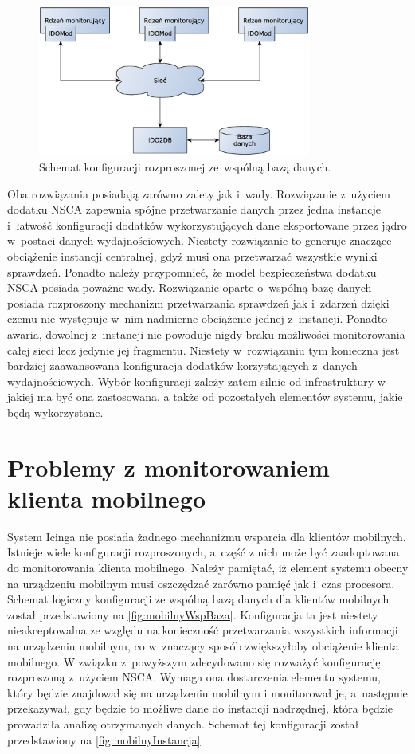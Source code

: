\begin{figure}[ht]
\centering
  \caption{Schemat konfiguracji rozproszonej ze~wspólną bazą danych.}
  \label{fig:rozpFull}
\includegraphics[width=0.8\textwidth]{img/icingaFull}
\end{figure}

Oba rozwiązania posiadają zarówno zalety jak i~wady. Rozwiązanie
z~użyciem dodatku NSCA zapewnia spójne przetwarzanie danych przez
jedna instancje i~łatwość konfiguracji dodatków wykorzystujących dane
eksportowane przez jądro w~postaci danych wydajnościowych. Niestety
rozwiązanie to generuje znaczące obciążenie instancji centralnej, gdyż
musi ona przetwarzać wszystkie wyniki sprawdzeń. Ponadto należy
przypomnieć, że model bezpieczeństwa dodatku NSCA posiada poważne
wady. Rozwiązanie oparte o~wspólną bazę danych posiada rozproszony
mechanizm przetwarzania sprawdzeń jak i~zdarzeń dzięki czemu nie
występuje w~nim nadmierne obciążenie jednej z~instancji. Ponadto
awaria, dowolnej z~instancji nie powoduje nigdy braku możliwości
monitorowania całej sieci lecz jedynie jej fragmentu. Niestety
w~rozwiązaniu tym konieczna jest bardziej zaawansowana konfiguracja
dodatków korzystających z~danych wydajnościowych. Wybór konfiguracji
zależy zatem silnie od infrastruktury w jakiej ma być ona zastosowana,
a także od pozostałych elementów systemu, jakie będą wykorzystane.


\section[Problemy][Problemy z monitorowaniem klienta mobilnego]{Problemy z monitorowaniem klienta mobilnego}

System Icinga nie posiada żadnego mechanizmu wsparcia dla klientów
mobilnych. Istnieje wiele konfiguracji rozproszonych, a~część z nich
może być zaadoptowana do monitorowania klienta mobilnego. Należy
pamiętać, iż element systemu obecny na urządzeniu mobilnym musi
oszczędzać zarówno pamięć jak i~czas procesora. Schemat logiczny
konfiguracji ze wspólną bazą danych dla klientów mobilnych został
przedstawiony na \ref{fig:mobilnyWspBaza}. Konfiguracja ta jest
niestety nieakceptowalna ze względu na konieczność przetwarzania
wszystkich informacji na urządzeniu mobilnym, co w~znaczący sposób
zwiększyłoby obciążenie klienta mobilnego.  W związku z~powyższym
zdecydowano się rozważyć konfigurację rozproszoną z~użyciem
NSCA. Wymaga ona dostarczenia elementu systemu, który będzie znajdował
się na urządzeniu mobilnym i monitorował je, a~następnie przekazywał,
gdy będzie to możliwe dane do instancji nadrzędnej, która będzie
prowadziła analizę otrzymanych danych. Schemat tej konfiguracji został
przedstawiony na \ref{fig:mobilnyInstancja}.

